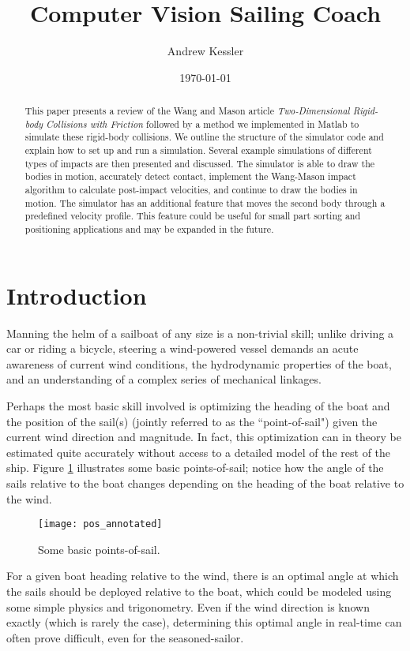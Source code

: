 \documentclass[letterpaper, 10 pt, conference]{ieeeconf}  %
\title{ \bf Computer Vision Sailing Coach}
\author{Andrew Kessler}
\date{\today}
\begin{document}
\maketitle


\begin{abstract}


This paper presents a review of the Wang and Mason article \emph{Two-Dimensional Rigid-body Collisions with Friction} followed by a method we implemented in Matlab to simulate these rigid-body collisions.  We outline the structure of the simulator code and explain how to set up and run a simulation.  Several example simulations of different types of impacts are then presented and discussed.  The simulator is able to draw the bodies in motion, accurately detect contact, implement the Wang-Mason impact algorithm to calculate post-impact velocities, and continue to draw the bodies in motion.  The simulator has an additional feature that moves the second body through a predefined velocity profile.  This feature could be useful for small part sorting and positioning applications and may be expanded in the future.  
\end{abstract}

\section{Introduction}
Manning the helm of a sailboat of any size is a non-trivial skill; unlike driving a car or riding a bicycle, steering a wind-powered vessel demands an acute awareness of current wind conditions, the hydrodynamic properties of the boat, and an understanding of a complex series of mechanical linkages. 

Perhaps the most basic skill involved is optimizing the heading of the boat and the position of the sail(s) (jointly referred to as the ``point-of-sail") given the current wind direction and magnitude. In fact, this optimization can in theory be estimated quite accurately without access to a detailed model of the rest of the ship. Figure \ref{fig:pos} illustrates some basic points-of-sail; notice how the angle of the sails relative to the boat changes depending on the heading of the boat relative to the wind. 

\begin{figure}[htbp]
   \centering
   \texttt{[image: pos\_annotated]} %
   \caption{Some basic points-of-sail.}
   \label{fig:pos}
\end{figure}
For a given boat heading relative to the wind, there is an optimal angle at which the sails should be deployed relative to the boat, which could be modeled using some simple physics and trigonometry. Even if the wind direction is known exactly (which is rarely the case), determining this optimal angle in real-time can often prove difficult, even for the seasoned-sailor.
\end{document}
